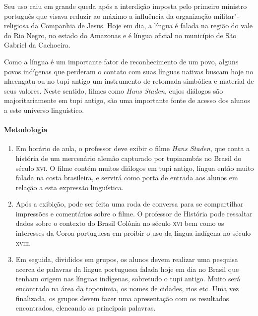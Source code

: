 \documentclass[12pt]{extarticle}
\begin{document}
{Seu uso caiu em grande queda após a interdição imposta pelo primeiro
ministro português que visava reduzir ao máximo a influência da organização
militar"-religiosa da Companhia de Jesus. Hoje em dia, a língua é falada
na região do vale do Rio Negro, no estado do Amazonas e é língua oficial 
no município de São Gabriel da Cachoeira. 

Como a língua é um importante fator de reconhecimento de um povo, 
alguns povos indígenas que perderam o contato com suas línguas nativas
buscam hoje no nheengatu ou no tupi antigo um instrumento de retomada
simbólica e material de seus valores. Neste sentido, filmes como \emph{Hans Staden},
cujos diálogos são majoritariamente em tupi antigo, são uma importante 
fonte de acesso dos alunos a este universo linguístico.  

\paragraph{Metodologia}

\begin{enumerate}

\item 
Em horário de aula, o professor deve exibir o filme \emph{Hans Staden},
que conta a história de um mercenário alemão capturado por tupinambás 
no Brasil do século \textsc{xvi}. O filme contém muitos diálogos em 
tupi antigo, língua então muito falada na costa brasileira, e servirá
como porta de entrada aos alunos em relação a esta expressão linguística.

\item 
Após a exibição, pode ser feita uma roda de conversa para se
compartilhar impressões e comentários sobre o filme. O professor de 
História pode ressaltar dados sobre o contexto do Brasil Colônia no 
século \textsc{xvi} bem como os interesses da Coroa portuguesa em proibir
o uso da língua indígena no século \textsc{xviii}.

\item 
Em seguida, divididos em grupos, os alunos devem realizar uma pesquisa 
acerca de palavras da língua portuguesa falada hoje em dia no Brasil 
que tenham origem nas línguas indígenas, sobretudo o tupi antigo. 
Muito será encontrado na área da toponímia, os nomes de cidades, rios etc.
Uma vez finalizada, os grupos devem fazer uma apresentação com os 
resultados encontrados, elencando as principais palavras. 
\end{enumerate}

}
\end{document}
